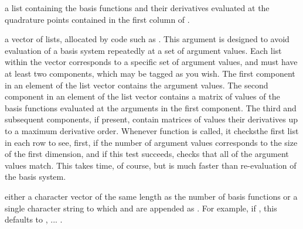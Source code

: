 \documentclass{article}
\begin{document}
\begin{Arguments}
\begin{ldescription}
\item[\code{values}] a list containing the basis functions and their derivatives
evaluated at the quadrature points contained in the first
column of .

\item[\code{basisvalues}] a vector of lists, allocated by code such as  .
This argument is designed to avoid evaluation of a basis system repeatedly
at a set of argument values.  Each list within the vector corresponds to a
specific set of argument values, and must have at least two components,
which may be tagged as you wish.  The first component in an element of the
list vector contains the argument values.  The second component in an
element of the list vector contains a matrix of values of the basis
functions evaluated at the arguments in the first component.  The third and
subsequent components, if present, contain matrices of values their
derivatives up to a maximum derivative order. Whenever function
 is called, it checksthe first list in each row to
see, first, if the number of argument values corresponds to the size of the
first dimension, and if this test succeeds, checks that all of the argument
values match.  This takes time, of course, but is much  faster than
re-evaluation of the basis system.

\item[\code{names}] either a character vector of the same length as the number of basis
functions or a single character string to which 
and  are appended as .  For example, if , this
defaults to , ... .

\end{ldescription}
\end{Arguments}
\end{document}
